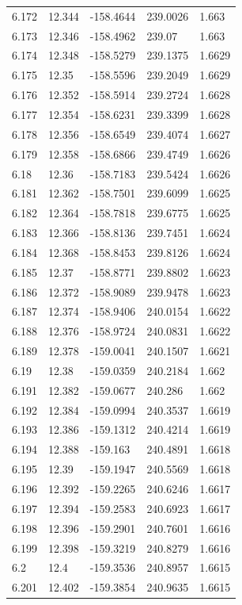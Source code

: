 \begin{tabular}{lllll}
6.172 & 12.344 & -158.4644 & 239.0026 & 1.663 \\
6.173 & 12.346 & -158.4962 & 239.07 & 1.663 \\
6.174 & 12.348 & -158.5279 & 239.1375 & 1.6629 \\
6.175 & 12.35 & -158.5596 & 239.2049 & 1.6629 \\
6.176 & 12.352 & -158.5914 & 239.2724 & 1.6628 \\
6.177 & 12.354 & -158.6231 & 239.3399 & 1.6628 \\
6.178 & 12.356 & -158.6549 & 239.4074 & 1.6627 \\
6.179 & 12.358 & -158.6866 & 239.4749 & 1.6626 \\
6.18 & 12.36 & -158.7183 & 239.5424 & 1.6626 \\
6.181 & 12.362 & -158.7501 & 239.6099 & 1.6625 \\
6.182 & 12.364 & -158.7818 & 239.6775 & 1.6625 \\
6.183 & 12.366 & -158.8136 & 239.7451 & 1.6624 \\
6.184 & 12.368 & -158.8453 & 239.8126 & 1.6624 \\
6.185 & 12.37 & -158.8771 & 239.8802 & 1.6623 \\
6.186 & 12.372 & -158.9089 & 239.9478 & 1.6623 \\
6.187 & 12.374 & -158.9406 & 240.0154 & 1.6622 \\
6.188 & 12.376 & -158.9724 & 240.0831 & 1.6622 \\
6.189 & 12.378 & -159.0041 & 240.1507 & 1.6621 \\
6.19 & 12.38 & -159.0359 & 240.2184 & 1.662 \\
6.191 & 12.382 & -159.0677 & 240.286 & 1.662 \\
6.192 & 12.384 & -159.0994 & 240.3537 & 1.6619 \\
6.193 & 12.386 & -159.1312 & 240.4214 & 1.6619 \\
6.194 & 12.388 & -159.163 & 240.4891 & 1.6618 \\
6.195 & 12.39 & -159.1947 & 240.5569 & 1.6618 \\
6.196 & 12.392 & -159.2265 & 240.6246 & 1.6617 \\
6.197 & 12.394 & -159.2583 & 240.6923 & 1.6617 \\
6.198 & 12.396 & -159.2901 & 240.7601 & 1.6616 \\
6.199 & 12.398 & -159.3219 & 240.8279 & 1.6616 \\
6.2 & 12.4 & -159.3536 & 240.8957 & 1.6615 \\
6.201 & 12.402 & -159.3854 & 240.9635 & 1.6615 \\

\end{tabular}
